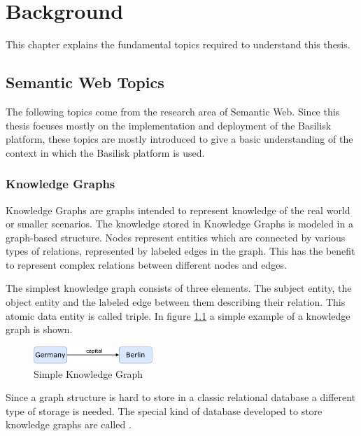 \chapter{Background}
\label{ch:background}

This chapter explains the fundamental topics required to understand this thesis.

\section{Semantic Web Topics}
The following topics come from the research area of Semantic Web.
Since this thesis focuses mostly on the implementation and deployment of the Basilisk platform, these topics are mostly introduced to give a basic understanding of the context in which the Basilisk platform is used.

\subsection{Knowledge Graphs} 
\label{sec:knowledge_graphs}
Knowledge Graphs are graphs intended to represent knowledge of the real world or smaller scenarios.
The knowledge stored in Knowledge Graphs is modeled in a graph-based structure. 
Nodes represent entities which are connected by various types of relations, represented by labeled edges in the graph.
This has the benefit to represent complex relations between different nodes and edges\cite{hoganKnowledgeGraphs2021}.

The simplest knowledge graph consists of three elements.
The subject entity, the object entity and the labeled edge between them describing their relation.
This atomic data entity is called triple.
In figure \ref{fig:example-knowledge-graph} a simple example of a knowledge graph is shown.

\begin{figure}[tbph]
	\centering
	\includegraphics[width=0.4\textwidth]{figures/knowledge-graph-diagram}
	\caption{Simple Knowledge Graph}
	\label{fig:example-knowledge-graph}
\end{figure}

Since a graph structure is hard to store in a classic relational database a different type of storage is needed.
The special kind of database developed to store knowledge graphs are called \tsp{}.


